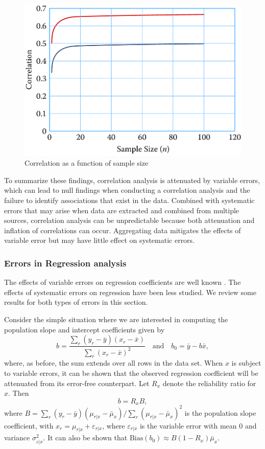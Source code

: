 \documentclass[]{krantz}
\begin{document}
\begin{figure}

{\centering \includegraphics[width=0.7\linewidth]{ChapterError/figures/fig10-5} 

}

\caption{Correlation as a function of sample size}\label{fig:fig10-5}
\end{figure}

To summarize these findings, correlation analysis is attenuated by
variable errors, which can lead to null findings when conducting a
correlation analysis and the failure to identify associations that exist
in the data. Combined with systematic errors that may arise when data
are extracted and combined from multiple sources, correlation analysis
can be unpredictable because both attenuation and inflation of
correlations can occur. Aggregating data mitigates the effects of
variable error but may have little effect on systematic errors.

\subsubsection{Errors in Regression analysis}\label{sec:10-4.2.5}

The effects of variable errors on regression coefficients are well known
\citep{cochran1968errors, fuller1991regression, biemer1997review}. The
effects of systematic errors on regression have been less studied. We
review some results for both types of errors in this section.

Consider the simple situation where we are interested in computing the
population slope and intercept coefficients given by
\[\label{eq:10-1.10}
b = \frac{\sum_r {(y_r - \bar{y})(x_r - \bar{x})} }{\sum_r {(x_r
- \bar{x})^2} }\quad\mbox{and}\quad b_0 = \bar{y} - b\bar{x},\] where,
as before, the sum extends over all rows in the data set. When \(x\) is
subject to variable errors, it can be shown that the observed regression
coefficient will be attenuated from its error-free counterpart. Let
\(R_x\) denote the reliability ratio for \(x\). Then
\[\label{eq:10-1.11}
b = R_x B,\] where
\(B = \sum_r {(y_r - \bar{y})(\mu_{r\vert x} - \bar{\mu }_x )} / \sum_r {(\mu_{r\vert x} - \bar{\mu }_x )^2}\)
is the population slope coefficient, with
\(x_r = \mu_{r\vert x} + \varepsilon_{r\vert x}\), where
\(\varepsilon_{r\vert x}\) is the variable error with mean 0 and
variance \(\sigma_{\varepsilon\vert x}^2\). It can also be shown that
\(\mbox{Bias}(b_0 ) \approx B(1 - R_x )\bar{\mu }_x\).
\end{document}

